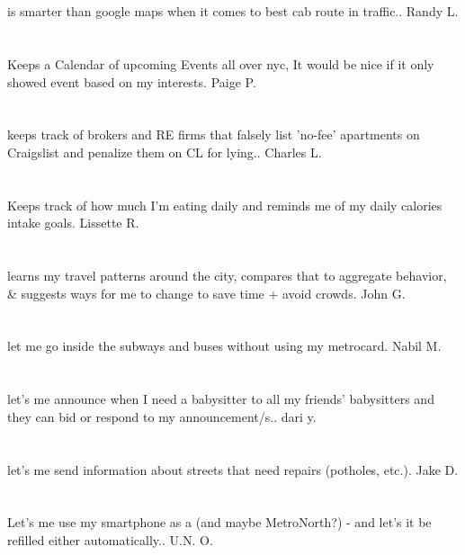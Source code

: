 \section{}is smarter than google maps when it comes to best cab route in traffic.. Randy L.
\section{}Keeps a Calendar of upcoming Events all over nyc,  It would be nice if it only showed event based on my interests. Paige P.
\section{}keeps track of brokers and RE firms that falsely list 'no-fee' apartments on Craigslist and penalize them on CL for lying.. Charles L.
\section{}Keeps track of how much I'm eating daily and reminds me of my daily calories intake goals. Lissette R.
\section{}learns my travel patterns around the city,  compares that to aggregate behavior,  \& suggests ways for me to change to save time + avoid crowds. John G.
\section{}let me go inside the subways and buses without using my metrocard. Nabil M.
\section{}let's me announce when I need a babysitter to all my friends' babysitters and they can bid or respond to my announcement/s.. dari y.
\section{}let's me send information about streets that need repairs (potholes,  etc.). Jake D.
\section{}Let's me use my smartphone as a  (and maybe MetroNorth?) - and let's it be refilled either automatically.. U.N. O.
